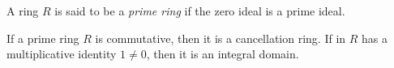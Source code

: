 \documentclass[12pt]{article}
\begin{document}
A ring $R$ is said to be a \emph{prime ring} if the zero ideal is a prime ideal.

If a prime ring $R$ is commutative, then it is a cancellation ring.  If in  $R$ has a multiplicative identity $1 \neq 0$, then it is an integral domain.
\end{document}
